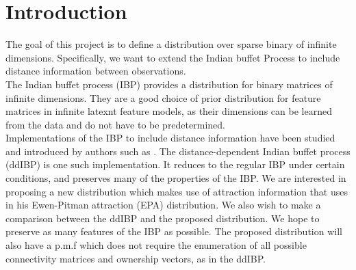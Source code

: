 \chapter{Introduction} %

The goal of this project is to define a distribution over sparse binary of
infinite dimensions. Specifically, we want to extend the Indian buffet Process
to include distance information between observations.\\

\noindent
The Indian buffet process (IBP) provides a distribution for binary matrices of
infinite dimensions. They are a good choice of prior distribution for feature
matrices in infinite latexnt feature models, as their dimensions can be learned
from the data and do not have to be predetermined.\\

\noindent
Implementations of the IBP to include distance information have been studied and
introduced by authors such as \cite{ddibp}. The distance-dependent Indian buffet
process (ddIBP) is one such implementation. It reduces to the regular IBP under
certain conditions, and preserves many of the properties of the IBP. We are 
interested in proposing a new distribution which makes use of attraction information
that \cite{epa} uses in his Ewen-Pitman attraction (EPA) distribution. We
also wish to make a comparison between the ddIBP and the proposed distribution.
We hope to preserve as many features of the IBP as possible. The proposed 
distribution will also have a p.m.f which does not require the enumeration of all
possible connectivity matrices and ownership vectors, as in the ddIBP.\\
